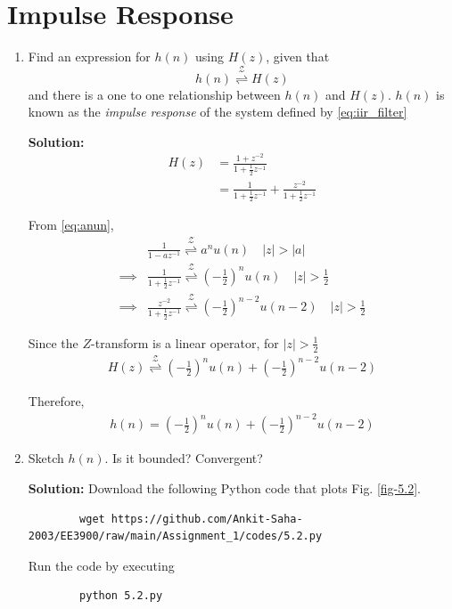 \documentclass[journal,12pt,twocolumn]{IEEEtran}
\newcommand{\solution}{\noindent \textbf{Solution: }}
\providecommand{\brak}[1]{\ensuremath{\left(#1\right)}}
\providecommand{\abs}[1]{\left\vert#1\right\vert}
\providecommand{\ztrans}{\overset{\mathcal{Z}}{ \rightleftharpoons}}
\numberwithin{equation}{section}
\renewcommand\thesection{\arabic{section}}
\begin{document}
	\section{Impulse Response}
	\begin{enumerate}[label=\thesection.\arabic*]
	\item \label{prob:impulse_resp}
	Find an expression for $h(n)$ using $H(z)$, given that 
	\begin{equation}
		\label{eq:impulse_resp}
		h(n) \ztrans H(z)
	\end{equation}
	and there is a one to one relationship between $h(n)$ and $H(z)$. $h(n)$ is known as the {\em impulse response} of the system defined by \eqref{eq:iir_filter}
	
	\solution
	\begin{align}
		H(z) &= \frac{1 + z^{-2}}{1 + \frac12 z^{-1}} \\
		&= \frac{1}{1 + \frac12 z^{-1}} + \frac{z^{-2}}{1 + \frac12 z^{-1}}
	\end{align}
	
	From \eqref{eq:anun},
	\begin{align}
		&\frac{1}{1-az^{-1}} \ztrans a^nu(n)  \quad \abs{z} > \abs{a} \\
		\implies &\frac{1}{1 + \frac12 z^{-1}} \ztrans \brak{-\frac12}^n u(n) \quad \abs{z} > \frac12 \\
		\implies &\frac{z^{-2}}{1 + \frac12 z^{-1}} \ztrans \brak{-\frac12}^{n-2} u(n-2) \quad \abs{z} > \frac12
	\end{align}
	
	Since the $Z$-transform is a linear operator, for $\abs{z} > \frac12$
	\begin{align}
		H(z) \ztrans \brak{-\frac12}^n u(n) + \brak{-\frac12}^{n-2} u(n-2)
	\end{align}
	
	Therefore, 
	\begin{align}
		h(n) = \brak{-\frac12}^n u(n) + \brak{-\frac12}^{n-2} u(n-2)
	\end{align}
	
	\item Sketch $h(n)$. Is it bounded? Convergent? 
	
	\solution Download the following Python code that plots Fig. \ref{fig-5.2}.
	\begin{lstlisting}
		wget https://github.com/Ankit-Saha-2003/EE3900/raw/main/Assignment_1/codes/5.2.py
	\end{lstlisting}
	
	Run the code by executing
	\begin{lstlisting}
		python 5.2.py
	\end{lstlisting}


\end{enumerate}
\end{document}
